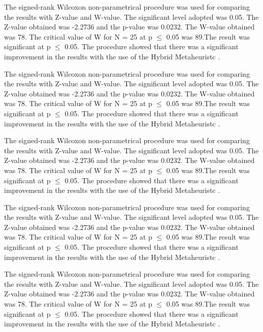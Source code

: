 \documentclass[times]{stvrauth}
\begin{document}
The signed-rank Wilcoxon non-parametrical procedure was used for comparing the results with Z-value and W-value. The significant level adopted was 0.05. The Z-value obtained was -2.2736 and the p-value was 0.0232. The W-value obtained was 78. The critical value of W for N = 25 at p $\leq$ 0.05 was 89.The result was significant at p $\leq$ 0.05. The procedure showed that there was a significant improvement in the results with the use of the Hybrid Metaheuristc .

The signed-rank Wilcoxon non-parametrical procedure was used for comparing the results with Z-value and W-value. The significant level adopted was 0.05. The Z-value obtained was -2.2736 and the p-value was 0.0232. The W-value obtained was 78. The critical value of W for N = 25 at p $\leq$ 0.05 was 89.The result was significant at p $\leq$ 0.05. The procedure showed that there was a significant improvement in the results with the use of the Hybrid Metaheuristc .

The signed-rank Wilcoxon non-parametrical procedure was used for comparing the results with Z-value and W-value. The significant level adopted was 0.05. The Z-value obtained was -2.2736 and the p-value was 0.0232. The W-value obtained was 78. The critical value of W for N = 25 at p $\leq$ 0.05 was 89.The result was significant at p $\leq$ 0.05. The procedure showed that there was a significant improvement in the results with the use of the Hybrid Metaheuristc .

The signed-rank Wilcoxon non-parametrical procedure was used for comparing the results with Z-value and W-value. The significant level adopted was 0.05. The Z-value obtained was -2.2736 and the p-value was 0.0232. The W-value obtained was 78. The critical value of W for N = 25 at p $\leq$ 0.05 was 89.The result was significant at p $\leq$ 0.05. The procedure showed that there was a significant improvement in the results with the use of the Hybrid Metaheuristc .

The signed-rank Wilcoxon non-parametrical procedure was used for comparing the results with Z-value and W-value. The significant level adopted was 0.05. The Z-value obtained was -2.2736 and the p-value was 0.0232. The W-value obtained was 78. The critical value of W for N = 25 at p $\leq$ 0.05 was 89.The result was significant at p $\leq$ 0.05. The procedure showed that there was a significant improvement in the results with the use of the Hybrid Metaheuristc .

\FloatBarrier



\end{document}
